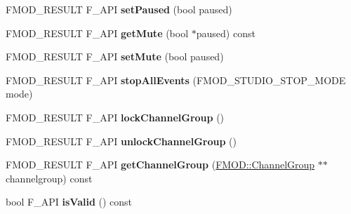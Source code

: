 \begin{DoxyCompactItemize}
\item 
\hypertarget{class_f_m_o_d_1_1_studio_1_1_bus_a082c38979aaaf168513b1285aed2aa2f}{F\+M\+O\+D\+\_\+\+R\+E\+S\+U\+L\+T F\+\_\+\+A\+P\+I {\bfseries set\+Paused} (bool paused)}\label{class_f_m_o_d_1_1_studio_1_1_bus_a082c38979aaaf168513b1285aed2aa2f}

\item 
\hypertarget{class_f_m_o_d_1_1_studio_1_1_bus_a904b9e7a5388ea0d9348a029da9e3009}{F\+M\+O\+D\+\_\+\+R\+E\+S\+U\+L\+T F\+\_\+\+A\+P\+I {\bfseries get\+Mute} (bool $\ast$paused) const }\label{class_f_m_o_d_1_1_studio_1_1_bus_a904b9e7a5388ea0d9348a029da9e3009}

\item 
\hypertarget{class_f_m_o_d_1_1_studio_1_1_bus_aaafd3a4f3a2b95560150665d48a237e1}{F\+M\+O\+D\+\_\+\+R\+E\+S\+U\+L\+T F\+\_\+\+A\+P\+I {\bfseries set\+Mute} (bool paused)}\label{class_f_m_o_d_1_1_studio_1_1_bus_aaafd3a4f3a2b95560150665d48a237e1}

\item 
\hypertarget{class_f_m_o_d_1_1_studio_1_1_bus_ad59d014793f9eba2a59474b5122981d0}{F\+M\+O\+D\+\_\+\+R\+E\+S\+U\+L\+T F\+\_\+\+A\+P\+I {\bfseries stop\+All\+Events} (F\+M\+O\+D\+\_\+\+S\+T\+U\+D\+I\+O\+\_\+\+S\+T\+O\+P\+\_\+\+M\+O\+D\+E mode)}\label{class_f_m_o_d_1_1_studio_1_1_bus_ad59d014793f9eba2a59474b5122981d0}

\item 
\hypertarget{class_f_m_o_d_1_1_studio_1_1_bus_a11e793b7d91e8e0736f5058706f79fb0}{F\+M\+O\+D\+\_\+\+R\+E\+S\+U\+L\+T F\+\_\+\+A\+P\+I {\bfseries lock\+Channel\+Group} ()}\label{class_f_m_o_d_1_1_studio_1_1_bus_a11e793b7d91e8e0736f5058706f79fb0}

\item 
\hypertarget{class_f_m_o_d_1_1_studio_1_1_bus_a5b5f9cff36e851ea11599bc0a62fb052}{F\+M\+O\+D\+\_\+\+R\+E\+S\+U\+L\+T F\+\_\+\+A\+P\+I {\bfseries unlock\+Channel\+Group} ()}\label{class_f_m_o_d_1_1_studio_1_1_bus_a5b5f9cff36e851ea11599bc0a62fb052}

\item 
\hypertarget{class_f_m_o_d_1_1_studio_1_1_bus_a29e3284914c70c4e41c26b9f537a8463}{F\+M\+O\+D\+\_\+\+R\+E\+S\+U\+L\+T F\+\_\+\+A\+P\+I {\bfseries get\+Channel\+Group} (\hyperlink{class_f_m_o_d_1_1_channel_group}{F\+M\+O\+D\+::\+Channel\+Group} $\ast$$\ast$channelgroup) const }\label{class_f_m_o_d_1_1_studio_1_1_bus_a29e3284914c70c4e41c26b9f537a8463}

\item 
\hypertarget{class_f_m_o_d_1_1_studio_1_1_bus_a5369c25a3ca00fb64fd0d4893c973cc2}{bool F\+\_\+\+A\+P\+I {\bfseries is\+Valid} () const }\label{class_f_m_o_d_1_1_studio_1_1_bus_a5369c25a3ca00fb64fd0d4893c973cc2}


\end{DoxyCompactItemize}
